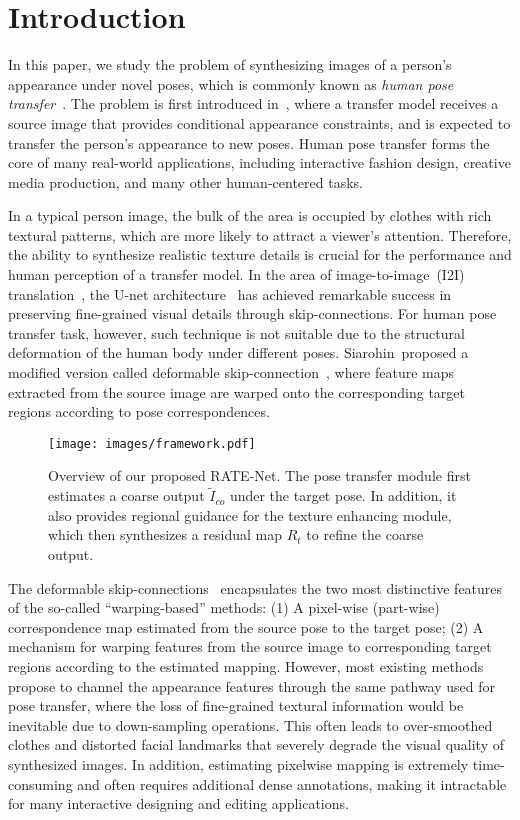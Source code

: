 \documentclass{article}
\begin{document}
\section{Introduction}

In this paper, we study the problem of synthesizing images of a person's appearance under novel poses, which is commonly known as \emph{human pose transfer}~\cite{PG2,DeformableGAN,PATN}.
The problem is first introduced in~\cite{PG2}, where a transfer model receives a source image that provides conditional appearance constraints, and is expected to transfer the person's appearance to new poses. Human pose transfer forms the core of many real-world applications, including interactive fashion design, creative media production, and many other human-centered tasks.

In a typical person image, the bulk of the area is occupied by clothes with rich textural patterns, which are more likely to attract a viewer's attention. Therefore, the ability to synthesize realistic texture details is crucial for the performance and human perception of a transfer model. In the area of image-to-image~(I2I) translation~\cite{pix2pix,cyclegan}, the U-net architecture~\cite{unet} has achieved remarkable success in preserving fine-grained visual details through skip-connections. For human pose transfer task, however, such technique is not suitable due to the structural deformation of the human body under different poses. Siarohin~\etal proposed a modified version called deformable skip-connection~\cite{DeformableGAN}, where feature maps extracted from the source image are warped onto the corresponding target regions according to pose correspondences.


\begin{figure}[t]
  \centering
  \texttt{[image: images/framework.pdf]}
  \caption{Overview of our proposed RATE-Net. The pose transfer module first estimates a coarse output $\tilde{I}_{co}$ under the target pose. In addition, it also provides regional guidance for the texture enhancing module, which then synthesizes a residual map $R_t$ to refine the coarse output.}\label{fig:framework}
\end{figure}

The deformable skip-connections~\cite{DeformableGAN} encapsulates the two most distinctive features of the so-called ``warping-based'' methods:
(1) A pixel-wise (part-wise) correspondence map estimated from the source pose to the target pose;
(2) A mechanism for warping features from the source image to corresponding target regions according to the estimated mapping.
However, most existing methods~\cite{DensePoseTransfer,softgate,DIAF,liquidwarpinggan} propose to channel the appearance features through the same pathway used for pose transfer, where the loss of fine-grained textural information would be inevitable due to down-sampling operations. This often leads to over-smoothed clothes and distorted facial landmarks that severely degrade the visual quality of synthesized images. In addition, estimating pixelwise mapping is extremely time-consuming and often requires additional dense annotations, making it intractable for many interactive designing and editing applications.
\end{document}
